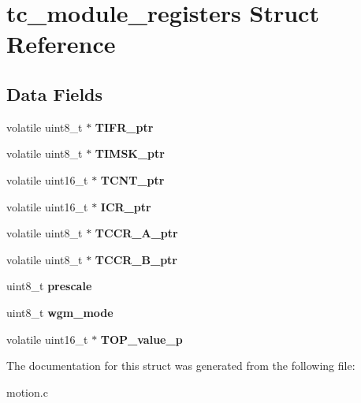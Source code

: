 \section{tc\+\_\+module\+\_\+registers Struct Reference}
\label{structtc__module__registers}
\subsection*{Data Fields}
\begin{DoxyCompactItemize}
\item 
volatile uint8\+\_\+t $\ast$ {\bfseries T\+I\+F\+R\+\_\+ptr}\label{structtc__module__registers_aeedf1046b5839d409a062d57db659be3}

\item 
volatile uint8\+\_\+t $\ast$ {\bfseries T\+I\+M\+S\+K\+\_\+ptr}\label{structtc__module__registers_ae234affdd388677523c04915ce08a7ff}

\item 
volatile uint16\+\_\+t $\ast$ {\bfseries T\+C\+N\+T\+\_\+ptr}\label{structtc__module__registers_afe77818f75c685966eb2164d8e163cce}

\item 
volatile uint16\+\_\+t $\ast$ {\bfseries I\+C\+R\+\_\+ptr}\label{structtc__module__registers_a12038ce56365e723fe183a5331cc3f03}

\item 
volatile uint8\+\_\+t $\ast$ {\bfseries T\+C\+C\+R\+\_\+\+A\+\_\+ptr}\label{structtc__module__registers_a898e9463cefe8762d109f1ef250c5e13}

\item 
volatile uint8\+\_\+t $\ast$ {\bfseries T\+C\+C\+R\+\_\+\+B\+\_\+ptr}\label{structtc__module__registers_a00ac921da136f9af2f1832a4dd243d88}

\item 
uint8\+\_\+t {\bfseries prescale}\label{structtc__module__registers_ab2b985595889f8fc543d56f32d9e8040}

\item 
uint8\+\_\+t {\bfseries wgm\+\_\+mode}\label{structtc__module__registers_a272a3b5aca6bb0aa2190d4f60d979783}

\item 
volatile uint16\+\_\+t $\ast$ {\bfseries T\+O\+P\+\_\+value\+\_\+p}\label{structtc__module__registers_ac0a10e603c390e7ca6ff3935ad364a00}

\end{DoxyCompactItemize}


The documentation for this struct was generated from the following file\+:\begin{DoxyCompactItemize}
\item 
motion.\+c\end{DoxyCompactItemize}
